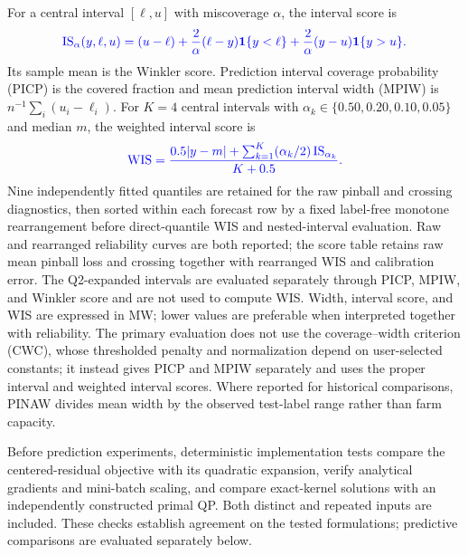 {\color{blue}For a central interval $[\ell,u]$ with miscoverage $\alpha$, the interval score is}
\begin{equation}
{\color{blue}
\operatorname{IS}_{\alpha}(y,\ell,u)=(u-\ell)+\frac{2}{\alpha}(\ell-y)\mathbf{1}\{y<\ell\}+\frac{2}{\alpha}(y-u)\mathbf{1}\{y>u\}.}
\end{equation}
{\color{blue}Its sample mean is the Winkler score. Prediction interval coverage probability (PICP) is the covered fraction and mean prediction interval width (MPIW) is $n^{-1}\sum_i(u_i-\ell_i)$. For $K=4$ central intervals with $\alpha_k\in\{0.50,0.20,0.10,0.05\}$ and median $m$, the weighted interval score is}
\begin{equation}
{\color{blue}
\operatorname{WIS}=\frac{0.5|y-m|+\sum_{k=1}^{K}(\alpha_k/2)\operatorname{IS}_{\alpha_k}}{K+0.5}.}
\end{equation}
{\color{blue}Nine independently fitted quantiles are retained for the raw pinball and crossing diagnostics, then sorted within each forecast row by a fixed label-free monotone rearrangement \citep{chernozhukov2010rearrangement} before direct-quantile WIS and nested-interval evaluation. Raw and rearranged reliability curves are both reported; the score table retains raw mean pinball loss and crossing together with rearranged WIS and calibration error. The Q2-expanded intervals are evaluated separately through PICP, MPIW, and Winkler score and are not used to compute WIS. Width, interval score, and WIS are expressed in MW; lower values are preferable when interpreted together with reliability. The primary evaluation does not use the coverage--width criterion (CWC), whose thresholded penalty and normalization depend on user-selected constants; it instead gives PICP and MPIW separately and uses the proper interval and weighted interval scores. Where reported for historical comparisons, PINAW divides mean width by the observed test-label range rather than farm capacity.}

{\color{blue}Before prediction experiments, deterministic implementation tests compare the centered-residual objective with its quadratic expansion, verify analytical gradients and mini-batch scaling, and compare exact-kernel solutions with an independently constructed primal QP. Both distinct and repeated inputs are included. These checks establish agreement on the tested formulations; predictive comparisons are evaluated separately below.}


